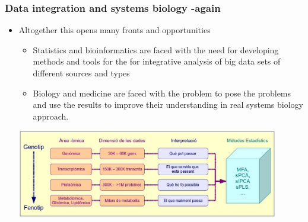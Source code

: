 \documentclass[handout]{beamer}
\begin{document}
\begin{frame}
\frametitle{Data integration and systems biology -again}
\label{sec-1-5}
\begin{itemize}

\item Altogether this opens many fronts and opportunities
\label{sec-1-5-1}%
\begin{itemize}
\item Statistics and bioinformatics are faced with the need for developing methods and tools for the for integrative analysis of big data sets of different sources and types
\label{sec-1-5-1-1}%
\item Biology and medicine are faced with the problem to pose the problems and use the results to improve their understanding in real systems biology approach.
\label{sec-1-5-1-2}%
\end{itemize} %
\includegraphics[width=0.9\textwidth]{./images/theOmicsCascade.png}
\end{itemize} %
\end{frame}
\end{document}
